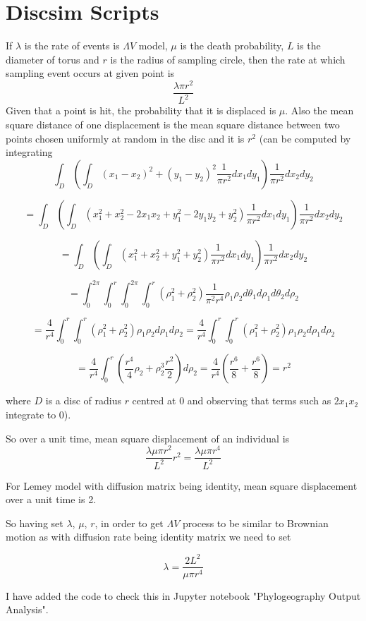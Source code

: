\section*{Discsim Scripts}

If $\lambda$ is the rate of events is $\Lambda V$ model, $\mu$ is the death probability, $L$ is the diameter of torus and $r$ is the radius of sampling circle, then the rate at which sampling event occurs at given point is
$$\frac{\lambda \pi r^2}{L^2}$$
Given that a point is hit, the probability that it is displaced is $\mu$. Also the mean square distance of one displacement is the mean square distance between two points chosen uniformly at random in the disc and it is $r^2$ (can be computed by integrating $$\int_D \left(\int_D(x_1-x_2)^2+(y_1-y_2)^2\frac{1}{\pi r^2}dx_1dy_1\right)\frac{1}{\pi r^2}dx_2dy_2$$

$$=\int_D \left(\int_D (x_1^2+x_2^2-2x_1x_2+y_1^2-2y_1y_2+y_2^2)\frac{1}{\pi r^2}dx_1dy_1\right)\frac{1}{\pi r^2}dx_2dy_2$$

$$=\int_D \left(\int_D (x_1^2+x_2^2+y_1^2+y_2^2)\frac{1}{\pi r^2}dx_1dy_1\right)\frac{1}{\pi r^2}dx_2dy_2$$

$$=\int_0^{2\pi} \int_0^{r} \int_0^{2\pi} \int_0^r  (\rho_1^2+\rho_2^2)\frac{1}{\pi^2 r^4} \rho_1\rho_2d\theta_1 d\rho_1 d\theta_2 d\rho_2$$

$$= \frac{4}{r^4}\int_0^{r}  \int_0^r  (\rho_1^2+\rho_2^2) \rho_1\rho_2 d\rho_1  d\rho_2= \frac{4}{r^4}\int_0^{r}  \int_0^r  (\rho_1^2+\rho_2^2) \rho_1\rho_2 d\rho_1  d\rho_2$$

$$= \frac{4}{r^4}\int_0^{r}\left(  \frac{r^4}{4}\rho_2+\rho_2^3\frac{r^2}{2}  \right)d\rho_2= \frac{4}{r^4}\left(  \frac{r^6}{8}+\frac{r^6}{8}  \right)=r^2$$




 where $D$ is a disc of radius $r$ centred at 0 and observing that terms such as $2x_1x_2$ integrate to 0).

So over a unit time, mean square displacement of an individual is
$$\frac{\lambda \mu \pi r^2}{L^2}r^2=\frac{\lambda \mu \pi r^4}{L^2}$$

For Lemey model with diffusion matrix being identity, mean square displacement over a unit time is 2. 

So having set $\lambda$, $\mu$, $r$, in order to get $\Lambda V$ process to be similar to Brownian motion as with diffusion rate being identity matrix we need to set

$$\lambda=\frac{2L^2}{\mu \pi r^4}$$

I have added the code to check this in Jupyter notebook "Phylogeography Output Analysis".



